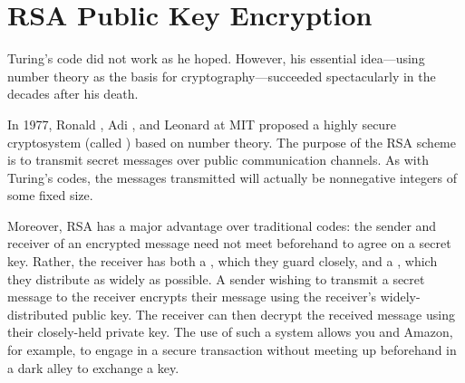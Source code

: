 \begin{problems}
\practiceproblems
{}

\classproblems
{}

\homeworkproblems
{}

\examproblems

\end{problems}

\section{RSA Public Key Encryption}\label{RSA_sec}

Turing's code did not work as he hoped.  However, his essential
idea---using number theory as the basis for cryptography---succeeded
spectacularly in the decades after his death.

In 1977, Ronald , Adi , and Leonard
 at MIT proposed a highly secure cryptosystem (called
\textbf{}) based on number theory.  The purpose of the RSA
scheme is to transmit secret messages over public communication
channels.  As with Turing's codes, the messages transmitted will
actually be nonnegative integers of some fixed size.

Moreover, RSA has a major advantage over traditional codes:
the sender and receiver of an encrypted message need not meet beforehand
to agree on a secret key.  Rather, the receiver has both a
, which they guard closely, and a ,
which they distribute as widely as possible.  A sender wishing to
transmit a secret message to the receiver encrypts their message using
the receiver's widely-distributed public key.  The receiver can then
decrypt the received message using their closely-held private key.
The use of such a  system allows you and
Amazon, for example, to engage in a secure transaction without meeting
up beforehand in a dark alley to exchange a key.

